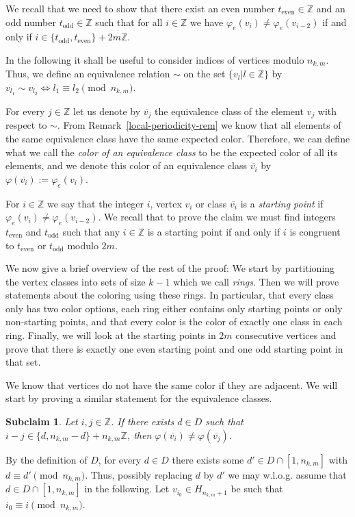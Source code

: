 \documentclass[a4paper,10pt,hidelinks]{amsart}
\newtheorem{subclaim}[theorem]{Subclaim}
\newenvironment{claimproof}[1][\proofname]{\proof[#1]\renewcommand{\qedsymbol}{$\blacksquare$}}{\endproof}
\newenvironment{subclaimproof}[1][\proofname]{\proof[#1]\renewcommand{\qedsymbol}{$\blacklozenge$}}{\endproof}
\theoremstyle{definition}
\begin{document}
\begin{claimproof}[Proof of Claim~\ref{structure-claim} when $k \in \{6,8\}$]
We recall that we need to show that there exist an even number $t_{\text{even}} \in \mathbb Z$ and an odd number $t_{\text{odd}} \in \mathbb{Z}$ such that for all $i \in \mathbb{Z}$ we have $\varphi_e(v_i) \neq \varphi_e(v_{i - 2})$ if and only if $i \in \{t_{\text{odd}}, t_{\text{even}}\} + 2m\mathbb{Z}$.

In the following it shall be useful to consider indices of vertices modulo $n_{k,m}$. Thus, we define an equivalence relation $\sim$ on the set $\{v_l|l\in\mathbb{Z}\}$ by $v_{l_1} \sim v_{l_2} \iff l_1 \equiv l_2 \pmod{n_{k,m}}$.

 For every $j \in \mathbb{Z}$ let us denote by $\overline{v_{j}}$ the equivalence class of the element $v_j$ with respect to $\sim$. From Remark~\ref{local-periodicity-rem} we know that all elements of the same equivalence class have the same expected color. Therefore, we can define what we call the \emph{color of an equivalence class} to be the expected color of all its elements, and we denote this color of an equivalence class $\overline{v_i}$ by $\varphi(\overline{v_{i}}) := \varphi_e(v_i)$. 


For $i \in \mathbb{Z}$ we say that the integer $i$, vertex $v_i$ or class $\overline{v_i}$ is a \emph{starting point} if $\varphi_e(v_i) \neq \varphi_e(v_{i-2})$. We recall that to prove the claim we must find integers $t_{\text{even}}$ and $t_{\text{odd}}$ such that any $i\in \mathbb{Z}$ is a starting point if and only if $i$ is congruent to $t_{\text{even}}$ or $t_{\text{odd}}$ modulo $2m$.

We now give a brief overview of the rest of the proof: We start by partitioning the vertex classes into sets of size $k-1$ which we call \emph{rings}. Then we will prove statements about the coloring using these rings. In particular, that every class only has two color options, each ring either contains only starting points or only non-starting points, and that every color is the color of exactly one class in each ring. Finally, we will look at the starting points in $2m$ consecutive vertices and prove that there is exactly one even starting point and one odd starting point in that set.

We know that vertices do not have the same color if they are adjacent. We will start by proving a similar statement for the equivalence classes.
        \begin{subclaim}\label{distance-edge-subclaim}
            Let $i,j\in\mathbb{Z}$. If there exists $d \in D$ such that $i - j \in \{d, n_{k,m} - d\} + n_{k,m}\mathbb{Z}$, then $\varphi(\overline{v_i}) \neq \varphi(\overline{v_j})$.
        \end{subclaim}
        \begin{subclaimproof}
            By the definition of $D$, for every $d\in D$ there exists some $d'\in D \cap [1, n_{k,m}]$ with $d\equiv d' \pmod{n_{k,m}}$. Thus, possibly replacing $d$ by $d'$ we may w.l.o.g. assume that $d\in D\cap [1,n_{k,m}]$ in the following. Let $v_{i_0} \in H_{n_{k,m} + 1}$ be such that $i_0 \equiv i \pmod{n_{k,m}}$.
            

\end{subclaimproof}
\end{claimproof}
\end{document}
